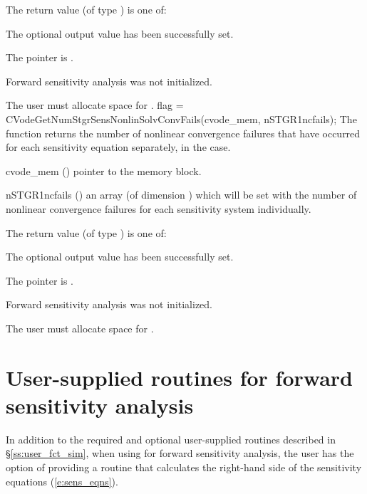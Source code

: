{
  The return value  (of type ) is one of:
  \begin{args}
  \item[\Id{CV\_SUCCESS}] 
    The optional output value has been successfully set.
  \item[\Id{CV\_MEM\_NULL}]
    The  pointer is .
  \item[\Id{CV\_NO\_SENS}]
    Forward sensitivity analysis was not initialized.
  \end{args}
}
{
  {\warn}The user must allocate space for .
}
{
  flag = CVodeGetNumStgrSensNonlinSolvConvFails(cvode\_mem, nSTGR1ncfails);
}
{
  The function  returns the
  number of nonlinear convergence failures that have occurred for
  each sensitivity equation separately, in the  case.
}
{
  \begin{args}
  \item[cvode\_mem] ()
    pointer to the {\cvodes} memory block.
  \item[nSTGR1ncfails] ()
    an array (of dimension ) which will be set with the
    number of nonlinear convergence failures for each sensitivity system individually.
  \end{args}
}
{
  The return value  (of type ) is one of:
  \begin{args}
  \item[\Id{CV\_SUCCESS}] 
    The optional output value has been successfully set.
  \item[\Id{CV\_MEM\_NULL}]
    The  pointer is .
  \item[\Id{CV\_NO\_SENS}]
    Forward sensitivity analysis was not initialized.
  \end{args}
}
{
  {\warn}The user must allocate space for .
}
\section{User-supplied routines for forward sensitivity analysis}
\label{s:user_fct_fwd}

In addition to the required and optional user-supplied routines described
in \S\ref{ss:user_fct_sim}, when using {\cvodes} for forward sensitivity analysis,
the user has the option of providing a routine that calculates the right-hand side 
of the sensitivity equations (\ref{e:sens_eqns}).

